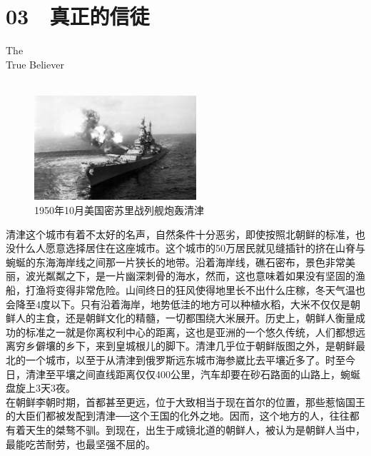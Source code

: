 \fancyhead[RO]{{\tiny{\textcolor{Gray}{\FA \ }}}\thepage}
\fancyhead[LE]{{\tiny{\textcolor{Gray}{\FA \ }}}\thepage}
\fancyfoot[LE,RO]{}
\fancyfoot[LO,CE]{}
\fancyfoot[CO,RE]{}
\chapter*{03 {\FA } 真正的信徒}
\vspace{5mm}
\begin{flushright}
	\textcolor{PinYinColor}{\EN \huge{The\\
	True Believer\\
	\ \\}}
\end{flushright}
\begin{figure}[!htbp]
	\centering
	\includegraphics[width=6cm]{./Chapters/Images/03.jpg}
	\caption*{1950年10月美国密苏里战列舰炮轰清津}
\end{figure}

清津这个城市有着不太好的名声，自然条件十分恶劣，即使按照北朝鲜的标准，也没什么人愿意选择居住在这座城市。这个城市的50万居民就见缝插针的挤在山脊与蜿蜒的东海海岸线之间那一片狭长的地带。沿着海岸线，礁石密布，景色非常美丽，波光粼粼之下，是一片幽深刺骨的海水，然而，这也意味着如果没有坚固的渔船，打渔将变得非常危险。山间终日的狂风使得地里长不出什么庄稼，冬天气温也会降至4度以下。只有沿着海岸，地势低洼的地方可以种植水稻，大米不仅仅是朝鲜人的主食，还是朝鲜文化的精髓，一切都围绕大米展开。历史上，朝鲜人衡量成功的标准之一就是你离权利中心的距离，这也是亚洲的一个悠久传统，人们都想远离穷乡僻壤的乡下，来到皇城根儿的脚下。清津几乎位于朝鲜版图之外，是朝鲜最北的一个城市，以至于从清津到俄罗斯远东城市海参崴比去平壤近多了。时至今日，清津至平壤之间直线距离仅仅400公里，汽车却要在砂石路面的山路上，蜿蜒盘旋上3天3夜。\\

在朝鲜李朝时期，首都甚至更远，位于大致相当于现在首尔的位置，那些惹恼国王的大臣们都被发配到清津──这个王国的化外之地。因而，这个地方的人，往往都有着天生的桀骜不驯。到现在，出生于咸镜北道的朝鲜人，被认为是朝鲜人当中，最能吃苦耐劳，也最坚强不屈的。\\

